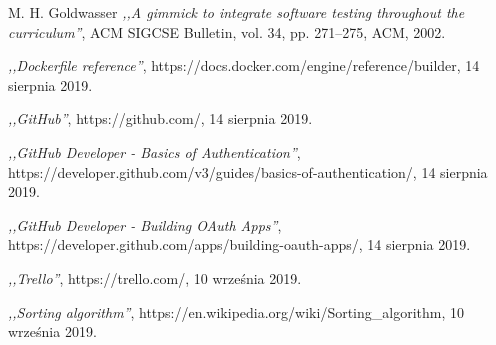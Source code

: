 \begin{thebibliography}{99}
 M. H. Goldwasser \emph{,,A gimmick to integrate software testing throughout the curriculum''}, ACM SIGCSE Bulletin, vol. 34, pp. 271–275, ACM, 2002.

  \emph{,,Dockerfile reference''}, \newline [Online] https://docs.docker.com/engine/reference/builder, 14 sierpnia 2019.

 \emph{,,GitHub''}, \newline [Online] https://github.com/, 14 sierpnia 2019.

 \emph{,,GitHub Developer - Basics of Authentication''}, \newline [Online] https://developer.github.com/v3/guides/basics-of-authentication/, 14 sierpnia 2019.

 \emph{,,GitHub Developer - Building OAuth Apps''}, \newline [Online] https://developer.github.com/apps/building-oauth-apps/, 14 sierpnia 2019.

 \emph{,,Trello''}, \newline [Online] https://trello.com/, 10 września 2019.

 \emph{,,Sorting algorithm''}, \newline [Online] https://en.wikipedia.org/wiki/Sorting\_algorithm, 10 września 2019.

\end{thebibliography}
\clearpage




